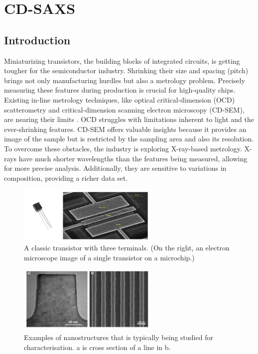 \section{CD-SAXS}
\subsection{Introduction}

\medskip

Miniaturizing transistors, the building blocks of integrated circuits, is getting
tougher for the semiconductor industry. Shrinking their size and spacing (pitch)
brings not only manufacturing hurdles but also a metrology problem. Precisely
measuring these features during production is crucial for high-quality chips.
Existing in-line metrology techniques, like optical critical-dimension (OCD)
scatterometry and critical-dimension scanning electron microscopy (CD-SEM), are
nearing their limits \cite{SEM_resolution,OCD_resolution}. OCD struggles with limitations inherent to light and the
ever-shrinking features. CD-SEM offers valuable insights because it provides an image of the sample but is restricted by
the sampling area and also its resolution. To overcome these obstacles, the industry is exploring X-ray-based metrology.
X-rays have much shorter wavelengths than the features being measured, allowing
for more precise analysis. Additionally, they are sensitive to variations in
composition, providing a richer data set.

\begin{figure}[h]
    \centering
    \includegraphics[width=0.6\textwidth]{images/transistor.png}
    \caption{A classic transistor with three terminals. (On the right, an electron microscope image of a single transistor on a microchip.)\cite{transistor}}
    \label{fig:transistor}
\end{figure}

\medskip


\begin{figure}
    \centering
    \includegraphics[width=0.6\textwidth]{images/example_structures.png}
    \caption{Examples of nanostructures that is typically being studied for characterisation. a is cross section of a line in b. \cite{rugosity}}
    \label{fig:typical_analyse}
\end{figure}

